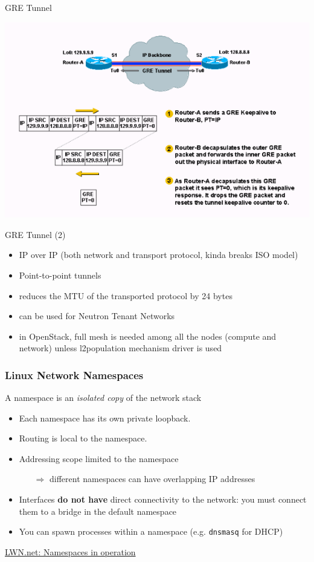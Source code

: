 \documentclass[english,serif,mathserif,xcolor=pdftex,dvipsnames,table]{beamer}
\begin{document}
\begin{frame}
  {GRE Tunnel}

\includegraphics[width=\linewidth]{64565-gre-tunnel-keepalive-2.png}
\end{frame}

\begin{frame}
  {GRE Tunnel (2)}

  \begin{itemize}
  \item IP over IP (both network and transport protocol, kinda breaks
    ISO model)
  \item Point-to-point tunnels
  \item reduces the MTU of the transported protocol by 24 bytes
  \item can be used for Neutron Tenant Networks
  \item in OpenStack, full mesh is needed among all the nodes (compute
    and network) unless l2population mechanism driver is used
  \end{itemize}
\end{frame}
\begin{frame}[fragile]
  \frametitle{Linux Network Namespaces}
A namespace is an \textit{isolated copy} of the network stack

\begin{itemize}
\item Each namespace has its own private loopback.
\item Routing is local to the namespace.
\item Addressing scope limited to the namespace
  \begin{itemize}
  \item[$\Rightarrow$] different namespaces can have overlapping IP addresses
  \end{itemize}
\item Interfaces \textbf{do not have} direct connectivity to the
  network: you must connect them to a bridge in the default namespace
\item You can spawn processes within a namespace
  (e.g. \texttt{dnsmasq} for DHCP)
\end{itemize}

{\footnotesize\href{http://lwn.net/Articles/531114/}{LWN.net: Namespaces
    in operation}}
\end{frame}
\end{document}
